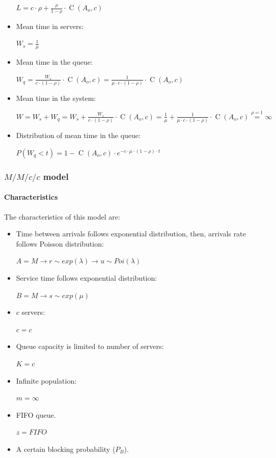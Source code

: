 \documentclass[../main.tex]{subfiles}
\begin{document}
\begin{itemize}
{		$
			L = c \cdot \rho + \frac {\rho} {1-\rho} \cdot \operatorname{C}(A_o, c)
		$
	}
	\item {
		Mean time in servers:

		$
			W_s = \frac {1} {\mu}
		$
	}
	\item {
		Mean time in the queue:

		$
			W_q =
			\frac {W_s} {c \cdot (1-\rho)} \cdot \operatorname{C}(A_o, c) =
			\frac {1} {\mu \cdot c \cdot (1-\rho)} \cdot \operatorname{C}(A_o, c)
		$
	}
	\item {
		Mean time in the system:

		$
			W =
			W_s + W_q =
			W_s + \frac {W_s} {c \cdot (1-\rho)} \cdot \operatorname{C}(A_o, c) =
			\frac {1} {\mu} + \frac {1} {\mu \cdot c \cdot (1-\rho)} \cdot \operatorname{C}(A_o, c)
			\overset {\rho=1} {=} \infty
		$
	}
	\item {
		Distribution of mean time in the queue:

		$
			P(W_q < t) = 1 - \operatorname{C}(A_o, c) \cdot e^{- c \cdot \mu \cdot (1-\rho) \cdot t}
		$
	}
\end{itemize}

\subsubsection{$M/M/c/c$ model}

\paragraph{Characteristics}

The characteristics of this model are:

\begin{itemize}
	\item {
		Time between arrivals follows exponential distribution, then, arrivals rate follows Poisson distribution:

		$
			A = M \rightarrow r \sim exp(\lambda) \rightarrow u \sim Poi(\lambda)
		$
	}
	\item {
		Service time follows exponential distribution:

		$
			B = M \rightarrow s \sim exp(\mu)
		$
	}
	\item {
		$c$ servers:

		$
			c = c
		$
	}
	\item {
		Queue capacity is limited to number of servers:

		$
			K = c
		$
	}
	\item {
		Infinite population:

		$
			m = \infty
		$
	}
	\item {
		FIFO queue.

		$
			z = FIFO
		$
	}
	\item A certain blocking probability ($P_B$).
\end{itemize}
\end{document}
